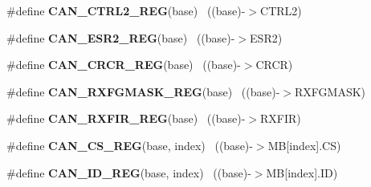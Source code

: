 \begin{DoxyCompactItemize}
\item 
\hypertarget{group___c_a_n___register___accessor___macros_ga3c0ddaade29c100875426d48d55b2d86}{}\#define {\bfseries C\+A\+N\+\_\+\+C\+T\+R\+L2\+\_\+\+R\+E\+G}(base)                                        ~((base)-\/$>$C\+T\+R\+L2)\label{group___c_a_n___register___accessor___macros_ga3c0ddaade29c100875426d48d55b2d86}

\item 
\hypertarget{group___c_a_n___register___accessor___macros_gac7a8b908fcbf6e6ab0e1334e4fc016c2}{}\#define {\bfseries C\+A\+N\+\_\+\+E\+S\+R2\+\_\+\+R\+E\+G}(base)                                          ~((base)-\/$>$E\+S\+R2)\label{group___c_a_n___register___accessor___macros_gac7a8b908fcbf6e6ab0e1334e4fc016c2}

\item 
\hypertarget{group___c_a_n___register___accessor___macros_ga0521321bfb9492998974d3ad267a8141}{}\#define {\bfseries C\+A\+N\+\_\+\+C\+R\+C\+R\+\_\+\+R\+E\+G}(base)                                          ~((base)-\/$>$C\+R\+C\+R)\label{group___c_a_n___register___accessor___macros_ga0521321bfb9492998974d3ad267a8141}

\item 
\hypertarget{group___c_a_n___register___accessor___macros_gaba4437c8c233beb2457cd30d2be5defa}{}\#define {\bfseries C\+A\+N\+\_\+\+R\+X\+F\+G\+M\+A\+S\+K\+\_\+\+R\+E\+G}(base)                                  ~((base)-\/$>$R\+X\+F\+G\+M\+A\+S\+K)\label{group___c_a_n___register___accessor___macros_gaba4437c8c233beb2457cd30d2be5defa}

\item 
\hypertarget{group___c_a_n___register___accessor___macros_ga87e42ff030ce54ff9e1a0c09c05ad4de}{}\#define {\bfseries C\+A\+N\+\_\+\+R\+X\+F\+I\+R\+\_\+\+R\+E\+G}(base)                                        ~((base)-\/$>$R\+X\+F\+I\+R)\label{group___c_a_n___register___accessor___macros_ga87e42ff030ce54ff9e1a0c09c05ad4de}

\item 
\hypertarget{group___c_a_n___register___accessor___macros_gac99a637d119cf05e14250a1465275522}{}\#define {\bfseries C\+A\+N\+\_\+\+C\+S\+\_\+\+R\+E\+G}(base,  index)                                  ~((base)-\/$>$M\+B\mbox{[}index\mbox{]}.C\+S)\label{group___c_a_n___register___accessor___macros_gac99a637d119cf05e14250a1465275522}

\item 
\hypertarget{group___c_a_n___register___accessor___macros_ga081389bb65f5ba1945fa2984d057044e}{}\#define {\bfseries C\+A\+N\+\_\+\+I\+D\+\_\+\+R\+E\+G}(base,  index)                                  ~((base)-\/$>$M\+B\mbox{[}index\mbox{]}.I\+D)\label{group___c_a_n___register___accessor___macros_ga081389bb65f5ba1945fa2984d057044e}


\end{DoxyCompactItemize}
